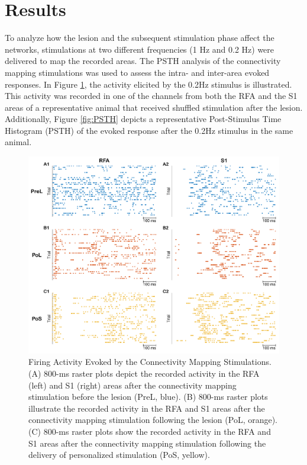 \section{Results}

To analyze how the lesion and the subsequent stimulation phase affect the networks, stimulations at two different frequencies (1 Hz and 0.2 Hz) were delivered to map the recorded areas. The PSTH analysis of the connectivity mapping stimulations was used to assess the intra- and inter-area evoked responses.
In Figure \ref{fig:RasterPSTH}, the activity elicited by the 0.2Hz stimulus is illustrated. This activity was recorded in one of the channels from both the RFA and the S1 areas of a representative animal that received shuffled stimulation after the lesion. Additionally, Figure \ref{fig:PSTH} depicts a representative Post-Stimulus Time Histogram (PSTH) of the evoked response after the 0.2Hz stimulus in the same animal.

\begin{figure}[htp]
    \begin{center}
    \includegraphics[width=\linewidth]{Figure/rasterplot PSTH/RasterPSTH.jpg}
    \end{center}
    \caption{Firing Activity Evoked by the Connectivity Mapping Stimulations. (A) 800-ms raster plots depict the recorded activity in the RFA (left) and S1 (right) areas after the connectivity mapping stimulation before the lesion (PreL, blue). (B) 800-ms raster plots illustrate the recorded activity in the RFA and S1 areas after the connectivity mapping stimulation following the lesion (PoL, orange). (C) 800-ms raster plots show the recorded activity in the RFA and S1 areas after the connectivity mapping stimulation following the delivery of personalized stimulation (PoS, yellow).}
    \label{fig:RasterPSTH}
\end{figure}

